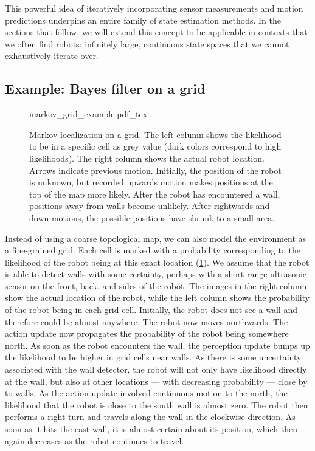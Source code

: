 This powerful idea of iteratively incorporating sensor measurements and motion predictions underpins an entire family of state estimation methods. In the sections that follow, we will extend this concept to be applicable in contexts that we often find robots: infinitely large, continuous state spaces that we cannot exhaustively iterate over.

\subsection{Example: Bayes filter on a grid}

\begin{figure}
	\centering
    \def\svgwidth{\textwidth}
    {markov_grid_example.pdf_tex}
	\caption{Markov localization on a grid. The left column shows the likelihood to be in a specific cell as grey value (dark colors correspond to high likelihoods). The right column shows the actual robot location. Arrows indicate previous motion. Initially, the position of the robot is unknown, but recorded upwards motion makes positions at the top of the map more likely. After the robot has encountered a wall, positions away from walls become unlikely. After rightwards and down motions, the possible positions have shrunk to a small area.}
	\label{fig:markov_grid_example}
\end{figure}

Instead of using a coarse topological map, we can also model the environment as a fine-grained grid. Each cell is marked with a probability corresponding to the likelihood of the robot being at this exact location (\cref{fig:markov_grid_example}). We assume that the robot is able to detect walls with some certainty, perhaps with a short-range ultrasonic sensor on the front, back, and sides of the robot. The images in the right column show the actual location of the robot, while the left column shows the probability of the robot being in each grid cell. Initially, the robot does not see a wall and therefore could be almost anywhere. The robot now moves northwards. The action update now propagates the probability of the robot being somewhere north. As soon as the robot encounters the wall, the perception update bumps up the likelihood to be higher in grid cells near walls. As there is some uncertainty associated with the wall detector, the robot will not only have likelihood directly at the wall, but also at other locations --- with decreasing probability --- close by to walls. As the action update involved continuous motion to the north, the likelihood that the robot is close to the south wall is almost zero. The robot then performs a right turn and travels along the wall in the clockwise direction. As soon as it hits the east wall, it is almost certain about its position, which then again decreases as the robot continues to travel.


